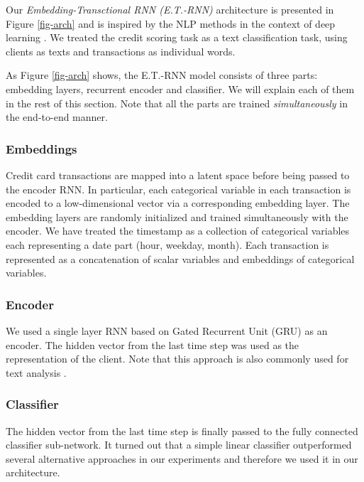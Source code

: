 \documentclass[sigconf]{acmart}
\begin{document}
Our \textit{Embedding-Transctional RNN (E.T.-RNN)} architecture is presented in Figure \ref{fig-arch} and is inspired by the NLP methods in the context of deep learning \cite{mikolov2010recurrent}. We treated the credit scoring task as a text classification task, using clients as texts and transactions as individual words.

As Figure \ref{fig-arch} shows, the E.T.-RNN model consists of three parts: embedding layers, recurrent encoder and classifier. We will explain each of them in the rest of this section. Note that all the parts are trained \textit{simultaneously} in the end-to-end manner.

\subsubsection{Embeddings}

Credit card transactions are mapped into a latent space before being passed to the encoder RNN. In particular, each categorical variable in each transaction is encoded to a low-dimensional vector via a corresponding embedding layer. The embedding layers are randomly initialized and trained simultaneously with the encoder. We have treated the timestamp as a collection of categorical variables each representing a date part (hour, weekday, month). Each transaction is represented as a concatenation of scalar variables and embeddings of categorical variables.

\subsubsection{Encoder}

We used a single layer RNN based on Gated Recurrent Unit (GRU) \cite{DBLP:journals/corr/ChoMGBSB14} as an encoder.  The hidden vector from the last time step was used as the representation of the client. Note that this approach is also commonly used for text analysis \cite{Sutskever:2014:SSL:2969033.2969173}.

\subsubsection{Classifier}

The hidden vector from the last time step is finally passed to the fully connected classifier sub-network.
It turned out that a simple linear classifier outperformed several alternative approaches in our experiments and therefore we used it in our architecture.
\end{document}
